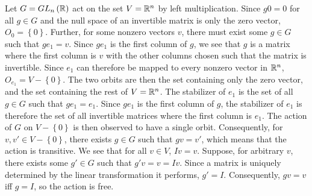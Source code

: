 \documentclass{article}
\begin{document}
\clearpage

Let $G = GL_n\left(\mathbb{R}\right)$ act on the set $V = \mathbb{R}^n$ by left multiplication. Since $g0 = 0$ for all $g \in G$ and the null space of an invertible matrix is only the zero vector, $O_0 = \left\{0\right\}$. Further, for some nonzero vectors $v$, there must exist some $g \in G$ such that $ge_1 = v$. Since $ge_1$ is the first column of $g$, we see that $g$ is a matrix where the first column is $v$ with the other columns chosen such that the matrix is invertible. Since $e_1$ can therefore be mapped to every nonzero vector in $\mathbb{R}^n$, $O_{e_1} = V - \left\{0\right\}$. The two orbits are then the set containing only the zero vector, and the set containing the rest of $V = \mathbb{R}^n$.
The stabilizer of $e_1$ is the set of all $g \in G$ such that $ge_1 = e_1$. Since $ge_1$ is the first column of $g$, the stabilizer of $e_1$ is therefore the set of all invertible matrices where the first column is $e_1$.
The action of $G$ on $V - \left\{0\right\}$ is then observed to have a single orbit. Consequently, for $v, v' \in V - \left\{0\right\}$, there exists $g \in G$ such that $gv = v'$, which means that the action is transitive. We see that for all $v \in V$, $Iv = v$. Suppose, for arbitrary $v$, there exists some $g' \in G$ such that $g'v = v = Iv$. Since a matrix is uniquely determined by the linear transformation it performs, $g' = I$. Consequently, $gv = v$ iff $g = I$, so the action is free.
\end{document}
